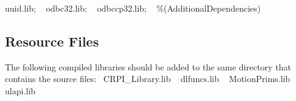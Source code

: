 uuid.\+lib; ~\newline
odbc32.\+lib; ~\newline
odbccp32.\+lib; ~\newline
\%(Additional\+Dependencies) \hypertarget{index_rsrc}{}\subsection{Resource Files}\label{index_rsrc}
The following compiled libraries should be added to the same directory that contains the source files\+:~\newline
C\+R\+P\+I\+\_\+\+Library.\+lib ~\newline
dlfuncs.\+lib ~\newline
Motion\+Prims.\+lib ~\newline
ulapi.\+lib 